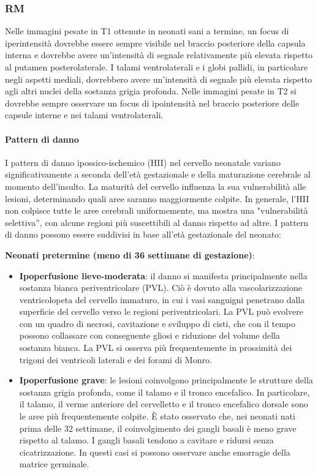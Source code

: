 \subsubsection{RM}
Nelle immagini pesate in T1 ottenute in neonati sani a termine, un focus di iperintensità dovrebbe essere sempre visibile nel braccio posteriore della capsula interna e dovrebbe avere un'intensità di segnale relativamente più elevata rispetto al putamen posterolaterale. I talami ventrolaterali e i globi pallidi, in particolare negli aspetti mediali, dovrebbero avere un'intensità di segnale più elevata rispetto agli altri nuclei della sostanza grigia profonda. Nelle immagini pesate in T2  si dovrebbe sempre osservare un focus di ipointensità nel braccio posteriore delle capsule interne e nei talami ventrolaterali.

\paragraph{Pattern di danno} I pattern di danno ipossico-ischemico (HII) nel cervello neonatale variano significativamente a seconda dell'età gestazionale e della maturazione cerebrale al momento dell'insulto. La maturità del cervello influenza la sua vulnerabilità alle lesioni, determinando quali aree saranno maggiormente colpite. In generale, l'HII non colpisce tutte le aree cerebrali uniformemente, ma mostra una "vulnerabilità selettiva'', con alcune regioni più suscettibili al danno rispetto ad altre. I pattern di danno possono essere suddivisi in base all'età gestazionale del neonato:

\textbf{Neonati pretermine (meno di 36 settimane di gestazione)}:

\begin{itemize}
	\tightlist
	\item
	\textbf{Ipoperfusione lieve-moderata}: il danno si manifesta principalmente nella sostanza bianca periventricolare (PVL). Ciò è dovuto alla vascolarizzazione ventricolopeta del cervello immaturo, in cui i vasi sanguigni penetrano dalla superficie del cervello verso le regioni periventricolari. La PVL può evolvere con un quadro di necrosi, cavitazione e sviluppo di cisti, che con il tempo possono collassare con conseguente gliosi e riduzione del volume della sostanza bianca. La PVL si osserva più frequentemente in prossimità dei trigoni dei ventricoli laterali e dei forami di Monro.
	\item
	\textbf{Ipoperfusione grave}: le lesioni coinvolgono principalmente le strutture della sostanza grigia profonda, come il talamo e il tronco encefalico. In particolare, il talamo, il verme anteriore del cervelletto e il tronco encefalico dorsale sono le aree più frequentemente colpite. È stato osservato che, nei neonati nati prima delle 32 settimane, il coinvolgimento dei gangli basali è meno grave rispetto al talamo. I gangli basali tendono a cavitare e ridursi senza cicatrizzazione. In questi casi si possono osservare anche emorragie della matrice germinale.
\end{itemize}

